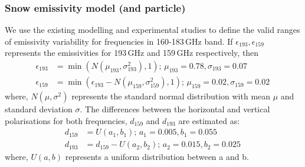 \documentclass[12pt,oneside,a4paper]{article}
\begin{document}
\subsubsection*{Snow emissivity model (and particle)}
%
We use the existing modelling and experimental studies \citep{harlow:2009:milli, harlow:2012:tundr,hewison:2002:airbo} to define the valid ranges of emissivity variability for frequencies in 160-183\,GHz band. If $\epsilon_{193}, \epsilon_{159}$ represents the emissivities for 193\,GHz and 159\,GHz respectively, then
\begin{align}
\epsilon_{193}& = \min({N(\mu_{193}, \sigma_{193}^{2}), 1});\, \mu_{193} = 0.78, \sigma_{193} = 0.07 \\
\epsilon_{159}& = \min(\epsilon_{193} - N(\mu_{159}, \sigma_{159}^{2}), 1) ;\,  \mu_{159} = 0.02, \sigma_{159} = 0.02\,
\end{align}
where, $N(\mu, \sigma^{2})$ represents the standard normal distribution with mean $\mu$ and standard deviation $\sigma$. The differences between the horizontal and vertical polarisations for both frequencies, $d_{159}$ and $d_{193}$ are estimated as:
\begin{align}
d_{159}& = U(a_1, b_1) ;\, a_1 = 0.005, b_1 = 0.055\\
d_{193}& = d_{159} - U(a_2, b_2) ;\, a_2 = 0.015, b_2 = 0.025 \,
\end{align}
where, $U(a, b)$ represents a uniform distribution between a and b. 
\end{document}
